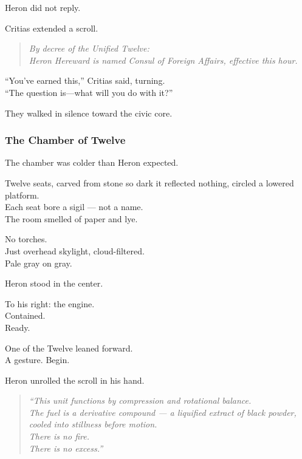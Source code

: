 \documentclass[12pt]{article}
\begin{document}
Heron did not reply.

\vspace{1em}

Critias extended a scroll.

\begin{quote}
\textit{By decree of the Unified Twelve:\\
Heron Hereward is named Consul of Foreign Affairs, effective this hour.}
\end{quote}

\vspace{1em}

“You’ve earned this,” Critias said, turning.\\
“The question is—what will you do with it?”

\vspace{1em}

They walked in silence toward the civic core.

\dotfill

\subsubsection{The Chamber of Twelve}

The chamber was colder than Heron expected.

Twelve seats, carved from stone so dark it reflected nothing, circled a lowered platform.\\
Each seat bore a sigil — not a name.\\
The room smelled of paper and lye.

No torches.\\
Just overhead skylight, cloud-filtered.\\
Pale gray on gray.

Heron stood in the center.

To his right: the engine.\\
Contained.\\
Ready.

\vspace{1em}

One of the Twelve leaned forward.\\
A gesture.  
Begin.

\vspace{1em}

Heron unrolled the scroll in his hand.

\begin{quote}
\textit{“This unit functions by compression and rotational balance.\\
The fuel is a derivative compound — a liquified extract of black powder, cooled into stillness before motion.\\
There is no fire.\\
There is no excess.”}
\end{quote}
\end{document}
